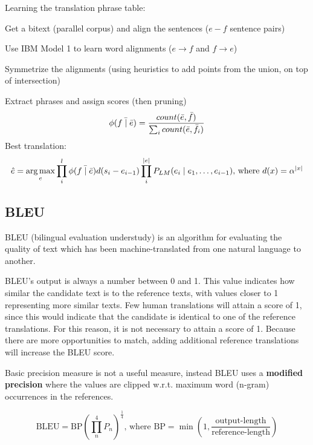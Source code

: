 \documentclass[12pt]{article}
\begin{document}
\par Learning the translation phrase table:
\olb
\item Get a bitext (parallel corpus) and align the sentences ($e-f$ sentence pairs)
\item Use IBM Model 1 to learn word alignments ($e\rightarrow f$ and $f\rightarrow e$)
\item Symmetrize the alignments (using heuristics to add points from the union, on top of intersection)
\item Extract phrases and assign scores (then pruning)
\[ \phi(\bar{f\mid \bar{e}}) = \frac{count(\bar{e},\bar{f})}{\sum_i count(\bar{e},\bar{f_i})} \]
\ole
Best translation:
\[ \hat{e} = \operatorname*{arg\,max}_e \prod_i^l  \phi(\bar{f\mid \bar{e}}) d(s_i - e_{i-1}) \prod_i^{|e|} P_{LM} (e_i\mid e_1,\dots ,e_{i-1}) \text{, where } d(x) = \alpha^{|x|} \]

\subsection{BLEU}
BLEU (bilingual evaluation understudy) is an algorithm for evaluating the quality of text which has been machine-translated from one natural language to another.
\par BLEU's output is always a number between 0 and 1. This value indicates how similar the candidate text is to the reference texts, with values closer to 1 representing more similar texts. Few human translations will attain a score of 1, since this would indicate that the candidate is identical to one of the reference translations. For this reason, it is not necessary to attain a score of 1. Because there are more opportunities to match, adding additional reference translations will increase the BLEU score.
\par Basic precision measure is not a useful measure, instead BLEU uses a \textbf{modified precision} where the values are clipped w.r.t. maximum word (n-gram) occurrences in the references.

\[ \text{BLEU} = \text{BP} \left( \prod_n^4 P_n \right)^{\frac{1}{4}} \text{, where } \text{BP} = \min\left(1, \frac{\text{output-length}}{\text{reference-length}} \right) \]
\end{document}
